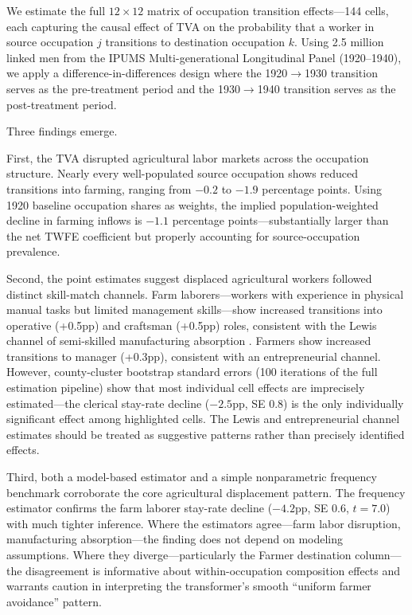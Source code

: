 \documentclass[12pt]{article}
\begin{document}
We estimate the full $12 \times 12$ matrix of occupation transition effects---144 cells, each capturing the causal effect of TVA on the probability that a worker in source occupation $j$ transitions to destination occupation $k$. Using 2.5 million linked men from the IPUMS Multi-generational Longitudinal Panel (1920--1940), we apply a difference-in-differences design where the 1920$\to$1930 transition serves as the pre-treatment period and the 1930$\to$1940 transition serves as the post-treatment period.

Three findings emerge.

First, the TVA disrupted agricultural labor markets across the occupation structure. Nearly every well-populated source occupation shows reduced transitions into farming, ranging from $-0.2$ to $-1.9$ percentage points. Using 1920 baseline occupation shares as weights, the implied population-weighted decline in farming inflows is $-1.1$ percentage points---substantially larger than the net TWFE coefficient but properly accounting for source-occupation prevalence.

Second, the point estimates suggest displaced agricultural workers followed distinct skill-match channels. Farm laborers---workers with experience in physical manual tasks but limited management skills---show increased transitions into operative (+0.5pp) and craftsman (+0.5pp) roles, consistent with the Lewis channel of semi-skilled manufacturing absorption \citep{lewis1954}. Farmers show increased transitions to manager (+0.3pp), consistent with an entrepreneurial channel. However, county-cluster bootstrap standard errors (100 iterations of the full estimation pipeline) show that most individual cell effects are imprecisely estimated---the clerical stay-rate decline ($-2.5$pp, SE 0.8) is the only individually significant effect among highlighted cells. The Lewis and entrepreneurial channel estimates should be treated as suggestive patterns rather than precisely identified effects.

Third, both a model-based estimator and a simple nonparametric frequency benchmark corroborate the core agricultural displacement pattern. The frequency estimator confirms the farm laborer stay-rate decline ($-4.2$pp, SE 0.6, $t = 7.0$) with much tighter inference. Where the estimators agree---farm labor disruption, manufacturing absorption---the finding does not depend on modeling assumptions. Where they diverge---particularly the Farmer destination column---the disagreement is informative about within-occupation composition effects and warrants caution in interpreting the transformer's smooth ``uniform farmer avoidance'' pattern.
\end{document}
